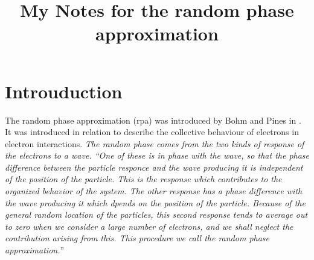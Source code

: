 \documentclass[12pt,a4paper,english]{article}
\title{My Notes for the random phase approximation}
\begin{document}
\section{Introuduction}
The random phase approximation (rpa) was introduced by Bohm and Pines in \cite{Bohm1951,Pines1952,Bohm1953}. It was introduced in relation to describe 
the collective behaviour of electrons in electron interactions.
\emph{The random phase comes from the two kinds of response of 
the electrons to a
wave. ``One of these is in phase with the wave, so that the phase difference
between the particle responce and the wave producing it is independent of
the position of the particle. This is the response which contributes to the 
organized behavior of the system. The other response has a phase difference
with the wave producing it which dpends on the position of the particle.
Because of the general random location of the particles, this second response 
tends to average out to zero when we consider a large number of electrons, and
we shall neglect the contribution arising from this. This procedure we call the
random phase approximation.}''\cite{Bohm1951}






%

\end{document}
